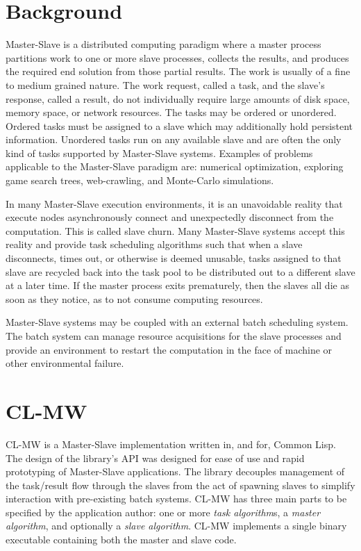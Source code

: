 \documentclass[titlepage,12pt]{book}
\newcommand{\xsmall}{\latexhtml{\small}{}}
\newcommand{\xnormalsize}{\latexhtml{\normalsize}{}}
\newcommand{\mw}{Master-Slave\xspace}
\newcommand{\clmw}{\xsmall\textsc{CL-MW}\xnormalsize\xspace}
\newcommand{\sa}{\textit{slave algorithm}\xspace}
\newcommand{\ma}{\textit{master algorithm}\xspace}
\newcommand{\tas}{\textit{task algorithm}s\xspace}
\begin{document}
\section{Background}
\mw is a distributed computing paradigm where a master process
partitions work to one or more slave processes, collects the results,
and produces the required end solution from those partial results.
The work is usually of a fine to medium grained nature. The work
request, called a task, and the slave's response, called a result,
do not individually require large amounts of disk space, memory space,
or network resources.  The tasks may be ordered or unordered. Ordered
tasks must be assigned to a slave which may additionally hold
persistent information.  Unordered tasks run on any available slave and
are often the only kind of tasks supported by \mw systems.  Examples of
problems applicable to the \mw paradigm are: numerical optimization,
exploring game search trees, web-crawling, and Monte-Carlo simulations.

In many \mw execution environments, it is an unavoidable reality that
execute nodes asynchronously connect and unexpectedly disconnect from
the computation.  This is called slave churn. Many \mw systems accept
this reality and provide task scheduling algorithms such that when
a slave disconnects, times out, or otherwise is deemed unusable,
tasks assigned to that slave are recycled back into the task pool
to be distributed out to a different slave at a later time. If the
master process exits prematurely, then the slaves all die as soon as
they notice, as to not consume computing resources.

\mw systems may be coupled with an external batch scheduling
system. The batch system can manage resource acquisitions for the
slave processes and provide an environment to restart the computation
in the face of machine or other environmental failure.

\section{\clmw}
\clmw is a \mw implementation written in, and for, Common Lisp. The
design of the library's API was designed for ease of use and rapid
prototyping of \mw applications.  The library decouples management
of the task/result flow through the slaves from the act of spawning
slaves to simplify interaction with pre-existing batch systems. \clmw
has three main parts to be specified by the application author: one
or more \tas, a \ma, and optionally a \sa. \clmw implements a single
binary executable containing both the master and slave code.
\end{document}
